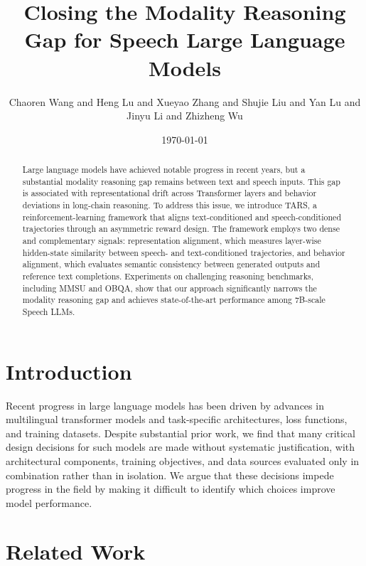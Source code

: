 \documentclass[12pt, a4paper]{article}
\begin{document}
\title{Closing the Modality Reasoning Gap for Speech Large Language Models}
\author{Chaoren Wang and Heng Lu and Xueyao Zhang and Shujie Liu and Yan Lu and Jinyu Li and Zhizheng Wu}
\date{\today}

\maketitle

\begin{abstract}
Large language models have achieved notable progress in recent years, but a substantial modality reasoning gap remains between text and speech inputs. This gap is associated with representational drift across Transformer layers and behavior deviations in long-chain reasoning. To address this issue, we introduce TARS, a reinforcement-learning framework that aligns text-conditioned and speech-conditioned trajectories through an asymmetric reward design. The framework employs two dense and complementary signals: representation alignment, which measures layer-wise hidden-state similarity between speech- and text-conditioned trajectories, and behavior alignment, which evaluates semantic consistency between generated outputs and reference text completions. Experiments on challenging reasoning benchmarks, including MMSU and OBQA, show that our approach significantly narrows the modality reasoning gap and achieves state-of-the-art performance among 7B-scale Speech LLMs.
\end{abstract}

\section{Introduction}

Recent progress in large language models has been driven by advances in multilingual transformer models and task-specific architectures, loss functions, and training datasets. Despite substantial prior work, we find that many critical design decisions for such models are made without systematic justification, with architectural components, training objectives, and data sources evaluated only in combination rather than in isolation. We argue that these decisions impede progress in the field by making it difficult to identify which choices improve model performance.

\section{Related Work}
\end{document}
